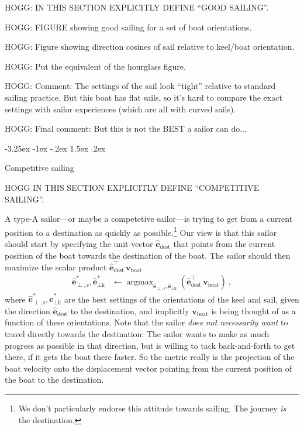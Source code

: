 \documentclass{article}
\makeatletter
\DeclareMathOperator*{\argmax}{argmax}
\renewcommand{\vec}[1]{\boldsymbol{#1}}
\newcommand{\uvec}{\vec{\hat{e}}}
\newcommand{\boat}{\text{boat}}
\newcommand{\destination}{\text{dest}}
\newcommand{\sail}{\text{s}}
\newcommand{\keel}{\text{k}}
\newcommand{\vboat}{\vec{v}_\boat}
\renewcommand\section{\@startsection {section}{1}{\z@}%
  {-3.25ex \@plus -1ex \@minus -.2ex}%
  {1.5ex \@plus .2ex}%
  {\raggedright\normalfont\large\bfseries}}
\makeatother
\begin{document}
HOGG: IN THIS SECTION EXPLICITLY DEFINE ``GOOD SAILING''.

HOGG: FIGURE showing good sailing for a set of boat orientations.

HOGG: Figure showing direction cosines of sail relative to keel/boat orientation.

HOGG: Put the equivalent of the hourglass figure.

HOGG: Comment: The settings of the sail look ``tight'' relative to standard sailing practice. But this boat has flat sails, so it's hard to compare the exact settings with sailor experiences (which are all with curved sails).

HOGG: Final comment: But this is not the BEST a sailor can do...

\section{Competitive sailing}\label{sec:racing}

HOGG IN THIS SECTION EXPLICITLY DEFINE ``COMPETITIVE SAILING''.

A type-A sailor---or maybe a competetive sailor---is trying to get from a current position to a destination as quickly as possible.\footnote{We don't particularly endorse this attitude towards sailing. The journey \emph{is} the destination.}
Our view is that this sailor should start by specifying the unit vector $\uvec_\destination$ that points from the current position of the boat towards the destination of the boat.
The sailor should then maximize the scalar product $\uvec_\destination^\top\,\vboat$
\begin{align}
    \uvec_{\perp,\sail}^\ast,\uvec_{\perp\keel}^\ast &\leftarrow \argmax_{\uvec_{\perp,\sail},\uvec_{\perp\keel}} (\uvec_\destination^\top\,\vboat) ~,
\end{align}
where $\uvec_{\perp,\sail}^\ast,\uvec_{\perp\keel}^\ast$ are the best settings of the orientations of the keel and sail, given the direction $\uvec_\destination$ to the destination, and implicitly $\vboat$ is being thought of as a function of these orientations.
Note that the sailor \emph{does not necessarily want} to travel directly towards the destination:
The sailor wants to make as much progress as possible in that direction, but is willing to tack back-and-forth to get there, if it gets the boat there faster.
So the metric really is the projection of the boat velocity onto the displacement vector pointing from the current position of the boat to the destination.
\end{document}
